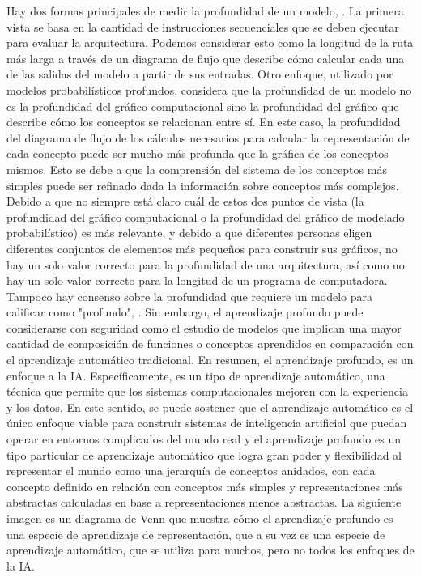	\vskip 0.4cm 
	Hay dos formas principales de medir la profundidad de un modelo, \citep{Goodfellow-et-al-2016}. La primera vista se basa en la cantidad de instrucciones secuenciales que se deben ejecutar para evaluar la arquitectura. Podemos considerar esto como la longitud de la ruta más larga a través de un diagrama de flujo que describe cómo calcular cada una de las salidas del modelo a partir de sus entradas. Otro enfoque, utilizado por modelos probabilísticos profundos, considera que la profundidad de un modelo no es la profundidad del gráfico computacional sino la profundidad del gráfico que describe cómo los conceptos se relacionan entre sí. En este caso, la profundidad del diagrama de flujo de los cálculos necesarios para calcular la representación de cada concepto puede ser mucho más profunda que la gráfica de los conceptos mismos. Esto se debe a que la comprensión del sistema de los conceptos más simples puede ser refinado dada la información sobre conceptos más complejos.
	\vskip 0.4cm 
	Debido a que no siempre está claro cuál de estos dos puntos de vista (la profundidad del gráfico computacional o la profundidad del gráfico de modelado probabilístico) es más relevante, y debido a que diferentes personas eligen diferentes conjuntos de elementos más pequeños para construir sus gráficos, no hay un solo valor correcto para la profundidad de una arquitectura, así como no hay un solo valor correcto para la longitud de un programa de computadora. Tampoco hay consenso sobre la profundidad que requiere un modelo para calificar como "profundo", \citep{Goodfellow-et-al-2016}. Sin embargo, el aprendizaje profundo puede considerarse con seguridad como el estudio de modelos que implican una mayor cantidad de composición de funciones o conceptos aprendidos en comparación con el aprendizaje automático tradicional.
	\vskip 0.4cm 
	En resumen, el aprendizaje profundo, es un enfoque a la IA. Específicamente, es un tipo de aprendizaje automático, una técnica que permite que los sistemas computacionales mejoren con la experiencia y los datos. En este sentido, se puede sostener que el aprendizaje automático es el único enfoque viable para construir sistemas de inteligencia artificial que puedan operar en entornos complicados del mundo real y el aprendizaje profundo es un tipo particular de aprendizaje automático que logra gran poder y flexibilidad al representar el mundo como una jerarquía de conceptos anidados, con cada concepto definido en relación con conceptos más simples y representaciones más abstractas calculadas en base a representaciones menos abstractas. La siguiente imagen es un diagrama de Venn que muestra cómo el aprendizaje profundo es una especie de aprendizaje de representación, que a su vez es una especie de aprendizaje automático, que se utiliza para muchos, pero no todos los enfoques de la IA. 

